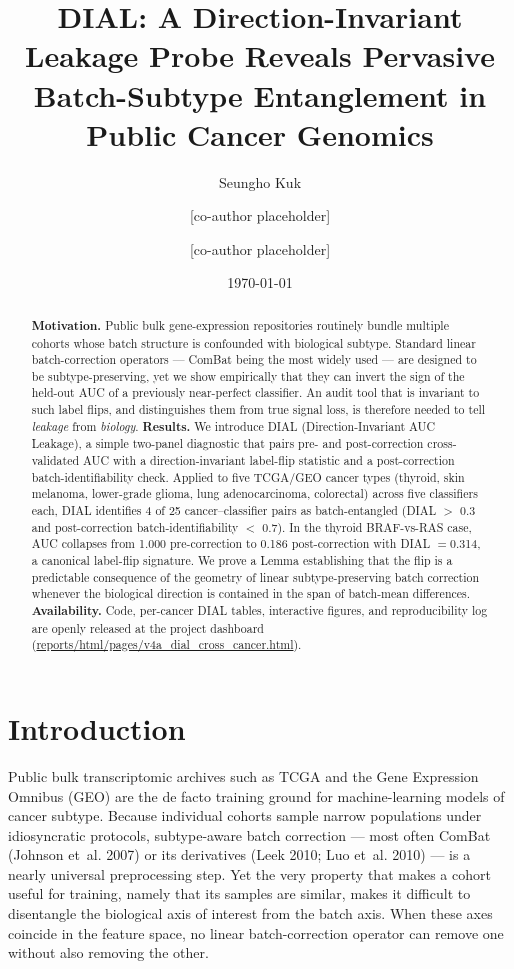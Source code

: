 \documentclass[11pt]{article}
\title{DIAL: A Direction-Invariant Leakage Probe Reveals Pervasive Batch-Subtype Entanglement in Public Cancer Genomics}
\author[1]{Seungho Kuk}
\author[1]{[co-author placeholder]}
\author[1]{[co-author placeholder]}
\affil[1]{Independent Computational Biology Research, Seoul, Republic of Korea}
\date{\today}
\begin{document}
\maketitle

\begin{abstract}
\textbf{Motivation.} Public bulk gene-expression repositories routinely bundle multiple cohorts whose batch structure is confounded with biological subtype. Standard linear batch-correction operators --- ComBat being the most widely used --- are designed to be subtype-preserving, yet we show empirically that they can invert the sign of the held-out AUC of a previously near-perfect classifier. An audit tool that is invariant to such label flips, and distinguishes them from true signal loss, is therefore needed to tell \emph{leakage} from \emph{biology}.
\textbf{Results.} We introduce DIAL (Direction-Invariant AUC Leakage), a simple two-panel diagnostic that pairs pre- and post-correction cross-validated AUC with a direction-invariant label-flip statistic and a post-correction batch-identifiability check. Applied to five TCGA/GEO cancer types (thyroid, skin melanoma, lower-grade glioma, lung adenocarcinoma, colorectal) across five classifiers each, DIAL identifies 4 of 25 cancer--classifier pairs as batch-entangled (DIAL $>$ 0.3 and post-correction batch-identifiability $<$ 0.7). In the thyroid BRAF-vs-RAS case, AUC collapses from 1.000 pre-correction to 0.186 post-correction with DIAL $= $0.314, a canonical label-flip signature. We prove a Lemma establishing that the flip is a predictable consequence of the geometry of linear subtype-preserving batch correction whenever the biological direction is contained in the span of batch-mean differences.
\textbf{Availability.} Code, per-cancer DIAL tables, interactive figures, and reproducibility log are openly released at the project dashboard (\url{reports/html/pages/v4a_dial_cross_cancer.html}).
\end{abstract}

\section{Introduction}

Public bulk transcriptomic archives such as TCGA and the Gene Expression Omnibus (GEO) are the de facto training ground for machine-learning models of cancer subtype. Because individual cohorts sample narrow populations under idiosyncratic protocols, subtype-aware batch correction --- most often ComBat (Johnson et~al. 2007) or its derivatives (Leek 2010; Luo et~al. 2010) --- is a nearly universal preprocessing step. Yet the very property that makes a cohort useful for training, namely that its samples are similar, makes it difficult to disentangle the biological axis of interest from the batch axis. When these axes coincide in the feature space, no linear batch-correction operator can remove one without also removing the other.
\end{document}
